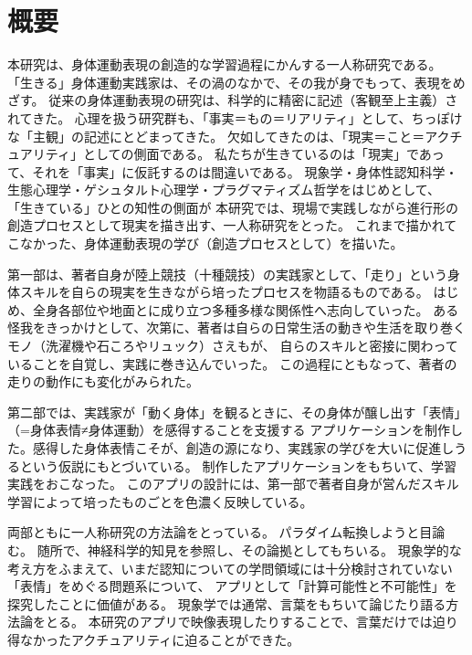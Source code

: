 \section*{概要}
本研究は、身体運動表現の創造的な学習過程にかんする一人称研究である。
「生きる」身体運動実践家は、その渦のなかで、その我が身でもって、表現をめざす。
従来の身体運動表現の研究は、科学的に精密に記述（客観至上主義）されてきた。
心理を扱う研究群も、「事実＝もの＝リアリティ」として、ちっぽけな「主観」の記述にとどまってきた。
欠如してきたのは、「現実＝こと＝アクチュアリティ」としての側面である。
私たちが生きているのは「現実」であって、それを「事実」に仮託するのは間違いである。
現象学・身体性認知科学・生態心理学・ゲシュタルト心理学・プラグマティズム哲学をはじめとして、
「生きている」ひとの知性の側面が
本研究では、現場で実践しながら進行形の創造プロセスとして現実を描き出す、一人称研究をとった。
これまで描かれてこなかった、身体運動表現の学び（創造プロセスとして）を描いた。

第一部は、著者自身が陸上競技（十種競技）の実践家として、「走り」という身体スキルを自らの現実を生きながら培ったプロセスを物語るものである。
はじめ、全身各部位や地面とに成り立つ多種多様な関係性へ志向していった。
ある怪我をきっかけとして、次第に、著者は自らの日常生活の動きや生活を取り巻くモノ（洗濯機や石ころやリュック）さえもが、
自らのスキルと密接に関わっていることを自覚し、実践に巻き込んでいった。
この過程にともなって、著者の走りの動作にも変化がみられた。

第二部では、実践家が「動く身体」を観るときに、その身体が醸し出す「表情」（=身体表情≠身体運動）を感得することを支援する
アプリケーションを制作した。感得した身体表情こそが、創造の源になり、実践家の学びを大いに促進しうるという仮説にもとづいている。
制作したアプリケーションをもちいて、学習実践をおこなった。
このアプリの設計には、第一部で著者自身が営んだスキル学習によって培ったものごとを色濃く反映している。

両部ともに一人称研究の方法論をとっている。
パラダイム転換しようと目論む。
随所で、神経科学的知見を参照し、その論拠としてもちいる。
現象学的な考え方をふまえて、いまだ認知についての学問領域には十分検討されていない「表情」をめぐる問題系について、
アプリとして「計算可能性と不可能性」を探究したことに価値がある。
現象学では通常、言葉をもちいて論じたり語る方法論をとる。
本研究のアプリで映像表現したりすることで、言葉だけでは迫り得なかったアクチュアリティに迫ることができた。
